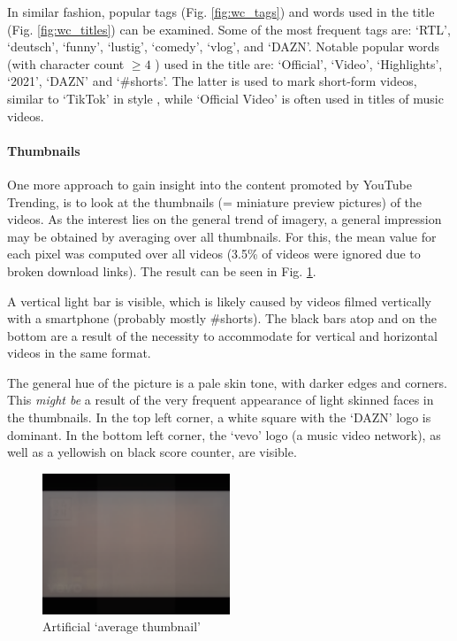 \documentclass{article}
\begin{document}
In similar fashion, popular tags (Fig. \ref{fig:wc_tags}) and words used in the title (Fig. \ref{fig:wc_titles}) can be examined. Some of the most frequent tags are: `RTL', `deutsch', `funny', `lustig', `comedy', `vlog', and `DAZN'. Notable popular words (with character count $\geq 4$ ) used in the title are: `Official', `Video', `Highlights', `2021', `DAZN' and `\#shorts'. The latter is used to mark short-form videos, similar to `TikTok' in style \cite{shorts_help}, while `Official Video' is often used in titles of music videos.

\paragraph{Thumbnails} One more approach to gain insight into the content promoted by YouTube Trending, is to look at the thumbnails (= miniature preview pictures) of the videos. As the interest lies on the general trend of imagery, a general impression may be obtained by averaging over all thumbnails. For this, the mean value for each pixel was computed over all videos (3.5\% of videos were ignored due to broken download links). The result can be seen in Fig. \ref{fig:avg_thumbnail}. 

A vertical light bar is visible, which is likely caused by videos filmed vertically with a smartphone (probably mostly \#shorts). The black bars atop and on the bottom are a result of the necessity to accommodate for vertical and horizontal videos in the same format. 

The general hue of the picture is a pale skin tone, with darker edges and corners. This \textit{might be} a result of the very frequent appearance of light skinned faces in the thumbnails. In the top left corner, a white square with the `DAZN' logo is dominant. In the bottom left corner, the `vevo' logo (a music video network), as well as a yellowish on black score counter, are visible.

\begin{figure}[ht]
    \centering
    \includegraphics[width=0.5\textwidth]{fig/average_thumbnail.png}
    \caption{Artificial `average thumbnail'}
    \label{fig:avg_thumbnail}
\end{figure}
\end{document}
